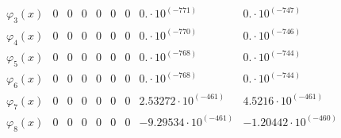 \documentclass{article}
\begin{document}
\begin{landscape}
$$\begin{array}{l|llllllll}
\varphi_3(x) & 0 & 0 & 0 & 0 & 0 & 0 & 0.\cdot 10^{(-771)} & 0.\cdot 10^{(-747)} \\ 
\varphi_4(x) & 0 & 0 & 0 & 0 & 0 & 0 & 0.\cdot 10^{(-770)} & 0.\cdot 10^{(-746)} \\ 
\varphi_5(x) & 0 & 0 & 0 & 0 & 0 & 0 & 0.\cdot 10^{(-768)} & 0.\cdot 10^{(-744)} \\ 
\varphi_6(x) & 0 & 0 & 0 & 0 & 0 & 0 & 0.\cdot 10^{(-768)} & 0.\cdot 10^{(-744)} \\ 
\varphi_7(x) & 0 & 0 & 0 & 0 & 0 & 0 & 2.53272\cdot 10^{(-461)} & 4.5216\cdot 10^{(-461)} \\ 
\varphi_8(x) & 0 & 0 & 0 & 0 & 0 & 0 & -9.29534\cdot 10^{(-461)} & -1.20442\cdot 10^{(-460)} \\ 
\end{array} $$ 
\end{landscape} 
\end{document}
